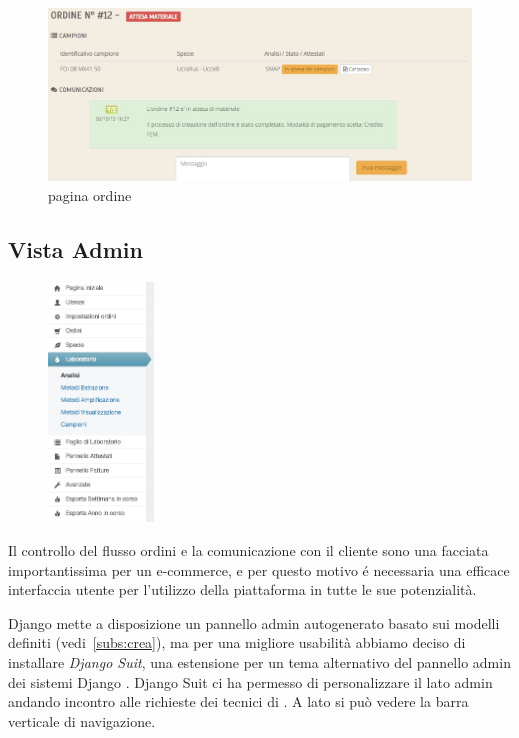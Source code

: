 \begin{figure}
 \includegraphics[width=1\textwidth]{images/po} 
 \caption{pagina ordine}
 \label{fig:po}
\end{figure}

\newpage
\subsection{Vista Admin}
\label{subs:admin}

\begin{figure}
  \begin{center}
    \includegraphics[width=0.25\textwidth]{images/suit}
  \end{center}
\end{figure}

Il controllo del flusso ordini e la comunicazione con il cliente sono una facciata importantissima per un e-commerce, e per questo motivo é necessaria una efficace interfaccia utente per l'utilizzo della piattaforma in tutte le sue potenzialità.

Django mette a disposizione un pannello admin autogenerato basato sui modelli definiti (vedi~\ref{subs:crea}), ma per una migliore usabilità abbiamo deciso di installare \emph{Django Suit}, una estensione per un tema alternativo del pannello admin dei sistemi Django \cite{suit}. Django Suit ci ha permesso di personalizzare il lato admin andando incontro alle richieste dei tecnici di {\fem}. A lato si può vedere la barra verticale di navigazione.

